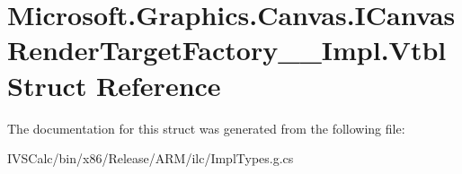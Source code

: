 \hypertarget{struct_microsoft_1_1_graphics_1_1_canvas_1_1_i_canvas_render_target_factory_____impl_1_1_vtbl}{}\section{Microsoft.\+Graphics.\+Canvas.\+I\+Canvas\+Render\+Target\+Factory\+\_\+\+\_\+\+Impl.\+Vtbl Struct Reference}
\label{struct_microsoft_1_1_graphics_1_1_canvas_1_1_i_canvas_render_target_factory_____impl_1_1_vtbl}


The documentation for this struct was generated from the following file\+:\begin{DoxyCompactItemize}
\item 
I\+V\+S\+Calc/bin/x86/\+Release/\+A\+R\+M/ilc/Impl\+Types.\+g.\+cs\end{DoxyCompactItemize}
